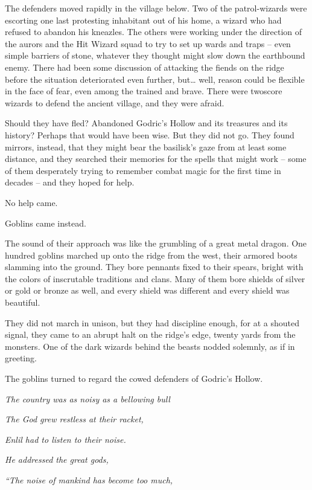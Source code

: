 The defenders moved rapidly in the village below. Two of the
patrol-wizards were escorting one last protesting inhabitant out of his
home, a wizard who had refused to abandon his kneazles. The others were
working under the direction of the aurors and the Hit Wizard squad to
try to set up wards and traps -- even simple barriers of stone, whatever
they thought might slow down the earthbound enemy. There had been some
discussion of attacking the fiends on the ridge before the situation
deteriorated even further, but\ldots{} well, reason could be flexible in
the face of fear, even among the trained and brave. There were twoscore
wizards to defend the ancient village, and they were afraid.

Should they have fled? Abandoned Godric's Hollow and its treasures and
its history? Perhaps that would have been wise. But they did not go.
They found mirrors, instead, that they might bear the basilisk's gaze
from at least some distance, and they searched their memories for the
spells that might work -- some of them desperately trying to remember
combat magic for the first time in decades -- and they hoped for help.

No help came.

Goblins came instead.

The sound of their approach was like the grumbling of a great metal
dragon. One hundred goblins marched up onto the ridge from the west,
their armored boots slamming into the ground. They bore pennants fixed
to their spears, bright with the colors of inscrutable traditions and
clans. Many of them bore shields of silver or gold or bronze as well,
and every shield was different and every shield was beautiful.

They did not march in unison, but they had discipline enough, for at a
shouted signal, they came to an abrupt halt on the ridge's edge, twenty
yards from the monsters. One of the dark wizards behind the beasts
nodded solemnly, as if in greeting.

The goblins turned to regard the cowed defenders of Godric's Hollow.

\mybreak

\emph{The country was as noisy as a bellowing bull}

\emph{The God grew restless at their racket,}

\emph{Enlil had to listen to their noise.}

\emph{He addressed the great gods,}

\emph{``The noise of mankind has become too much,}

